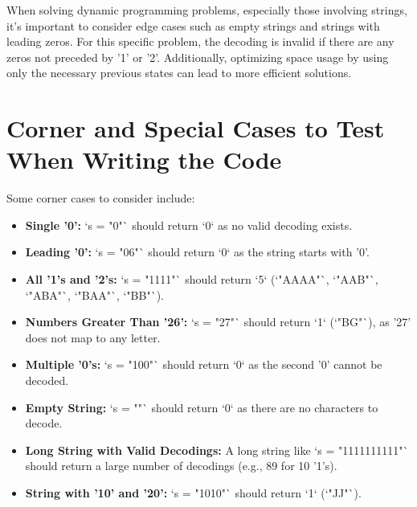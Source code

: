 When solving dynamic programming problems, especially those involving strings, it's important to consider edge cases such as empty strings and strings with leading zeros. For this specific problem, the decoding is invalid if there are any zeros not preceded by '1' or '2'. Additionally, optimizing space usage by using only the necessary previous states can lead to more efficient solutions.

\section*{Corner and Special Cases to Test When Writing the Code}

Some corner cases to consider include:

\begin{itemize}
    \item \textbf{Single '0':} `s = "0"` should return `0` as no valid decoding exists.
    
    \item \textbf{Leading '0':} `s = "06"` should return `0` as the string starts with '0'.
    
    \item \textbf{All '1's and '2's:} `s = "1111"` should return `5` (`"AAAA"`, `"AAB"`, `"ABA"`, `"BAA"`, `"BB"`).
    
    \item \textbf{Numbers Greater Than '26':} `s = "27"` should return `1` (`"BG"`), as '27' does not map to any letter.
    
    \item \textbf{Multiple '0's:} `s = "100"` should return `0` as the second '0' cannot be decoded.
    
    \item \textbf{Empty String:} `s = ""` should return `0` as there are no characters to decode.
    
    \item \textbf{Long String with Valid Decodings:} A long string like `s = "1111111111"` should return a large number of decodings (e.g., 89 for 10 '1's).
    
    \item \textbf{String with '10' and '20':} `s = "1010"` should return `1` (`"JJ"`).
\end{itemize}

